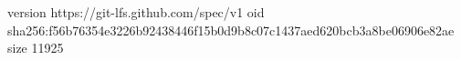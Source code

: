 version https://git-lfs.github.com/spec/v1
oid sha256:f56b76354e3226b92438446f15b0d9b8c07c1437aed620bcb3a8be06906e82ae
size 11925
